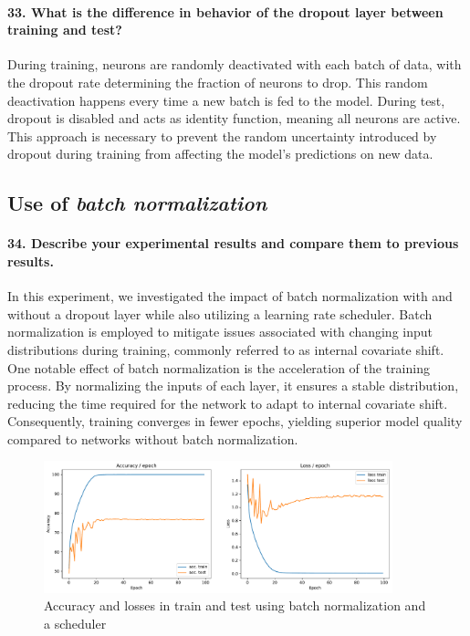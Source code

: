 \paragraph{33. What is the difference in behavior of the dropout layer between training and test?}
During training, neurons are randomly deactivated with each batch of data, with the dropout rate determining the fraction of neurons to drop. This random deactivation happens every time a new batch is fed to the model. During test, dropout is disabled and acts as identity function, meaning all neurons are active. This approach is necessary to prevent the random uncertainty introduced by dropout during training from affecting the model's predictions on new data.

\subsection{Use of \textit{batch normalization}}

\paragraph{34. Describe your experimental results and compare them to previous results.}

In this experiment, we investigated the impact of batch normalization with and without a dropout layer while also utilizing a learning rate scheduler. Batch normalization is employed to mitigate issues associated with changing input distributions during training, commonly referred to as internal covariate shift. One notable effect of batch normalization is the acceleration of the training process. By normalizing the inputs of each layer, it ensures a stable distribution, reducing the time required for the network to adapt to internal covariate shift. Consequently, training converges in fewer epochs, yielding superior model quality compared to networks without batch normalization.

\begin{figure}[H]
    \centering
    \includegraphics*[width=0.9\textwidth]{figs/CNN/batchnorm.pdf}
    \caption{Accuracy and losses in train and test using batch normalization and a scheduler}
    \label{fig:batchnorm}
\end{figure}

